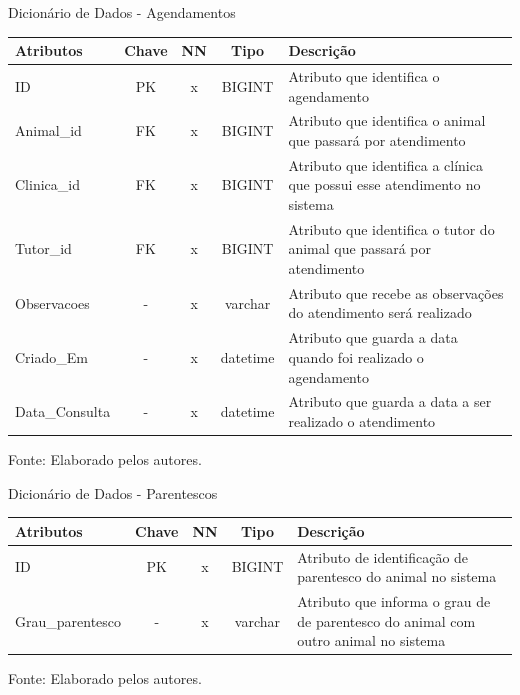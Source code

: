 \documentclass[
    12pt,               %
    openright,          %
    oneside,
    a4paper,            %
    BIBLATEX,           %
    TODO,               %
    english,            %
    brazil              %
    ]{ifsp-spo-inf-ctds}
\begin{document}
    \begin{center}
      \begin{quadro}[H]
      \centering
          \caption{Dicionário de Dados - Agendamentos}
          \begin{tabulary}{1.0\textwidth}{|p{9em}|c|c|c|p{19em}|}
        \hline
        Atributos & Chave & NN & Tipo & Descrição\\
        \hline
        ID & PK & x & BIGINT & Atributo que identifica o agendamento \\
        \hline
        Animal\_id & FK & x & BIGINT & Atributo que identifica o animal que passará por atendimento \\
        \hline
        Clinica\_id & FK & x & BIGINT & Atributo que identifica a clínica que possui esse atendimento no sistema \\
        \hline
        Tutor\_id & FK & x & BIGINT & Atributo que identifica o tutor do animal que passará por atendimento \\
        \hline
        Observacoes & - & x & varchar & Atributo que recebe as observações do atendimento será realizado \\
        \hline
        Criado\_Em & - & x & datetime & Atributo que guarda a data quando foi realizado o agendamento\\
        \hline
        Data\_Consulta & - & x & datetime & Atributo que guarda a data a ser realizado o atendimento \\
        \hline
        \end{tabulary}
         
          \label{qd: md-agendamento}
          \centering
        {\footnotesize Fonte: Elaborado pelos autores.}
      \end{quadro}
    \end{center} 

    \begin{center}
        \begin{quadro}[H]
        \centering
                \caption{Dicionário de Dados - Parentescos}
                  \begin{tabulary}{1.0\textwidth}{|p{9em}|c|c|c|p{19em}|}
            \hline
            Atributos & Chave & NN & Tipo & Descrição\\
            \hline
            ID & PK & x & BIGINT & Atributo de identificação de parentesco do animal no sistema \\
            \hline
            Grau\_parentesco & - & x & varchar & Atributo que informa o grau de de parentesco do animal com outro animal no sistema\\
            \hline
            \end{tabulary}
                 
                \label{qd: md-parentesco}
                \centering
        {\footnotesize Fonte: Elaborado pelos autores.}
              \end{quadro}
            \end{center}  
            
\end{document}
